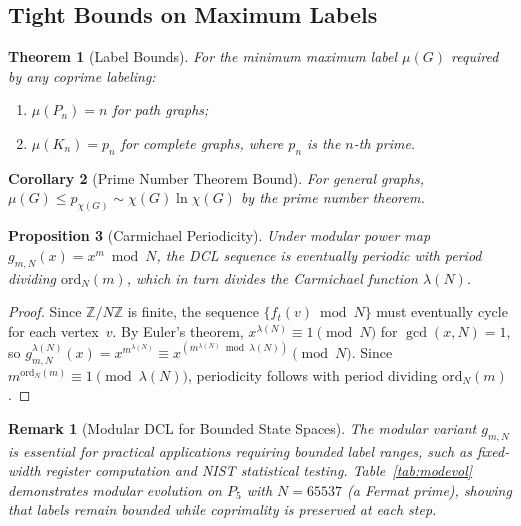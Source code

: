 \documentclass[lettersize,journal]{IEEEtran}
\newtheorem{theorem}{Theorem}
\newtheorem{corollary}[theorem]{Corollary}
\newtheorem{proposition}[theorem]{Proposition}
\newtheorem{remark}{Remark}
\begin{document}
\subsection{Tight Bounds on Maximum Labels}

\begin{theorem}[Label Bounds]
\label{thm:bounds}
For the minimum maximum label $\mu(G)$ required by any coprime labeling:
\begin{enumerate}
\item[(a)] $\mu(P_n) = n$ for path graphs;
\item[(b)] $\mu(K_n) = p_n$ for complete graphs, where $p_n$ is the $n$-th prime.
\end{enumerate}
\end{theorem}

\begin{corollary}[Prime Number Theorem Bound]
\label{cor:pnt}
For general graphs, $\mu(G) \leq p_{\chi(G)} \sim \chi(G) \ln \chi(G)$ by the prime number theorem.
\end{corollary}

\begin{proposition}[Carmichael Periodicity]
\label{prop:carm}
Under modular power map $g_{m,N}(x) = x^m \bmod N$, the DCL sequence is eventually periodic with period dividing $\text{ord}_N(m)$, which in turn divides the Carmichael function $\lambda(N)$.
\end{proposition}

\begin{proof}
Since $\mathbb{Z}/N\mathbb{Z}$ is finite, the sequence $\{f_t(v) \bmod N\}$ must eventually cycle for each vertex~$v$. By Euler's theorem, $x^{\lambda(N)} \equiv 1 \pmod{N}$ for $\gcd(x, N) = 1$, so $g_{m,N}^{\lambda(N)}(x) = x^{m^{\lambda(N)}} \equiv x^{(m^{\lambda(N)} \bmod \lambda(N))} \pmod{N}$. Since $m^{\text{ord}_N(m)} \equiv 1 \pmod{\lambda(N)}$, periodicity follows with period dividing $\text{ord}_N(m)$.
\end{proof}

\begin{remark}[Modular DCL for Bounded State Spaces]
The modular variant $g_{m,N}$ is essential for practical applications requiring bounded label ranges, such as fixed-width register computation and NIST statistical testing. Table~\ref{tab:modevol} demonstrates modular evolution on $P_5$ with $N = 65537$ (a Fermat prime), showing that labels remain bounded while coprimality is preserved at each step.
\end{remark}
\end{document}

